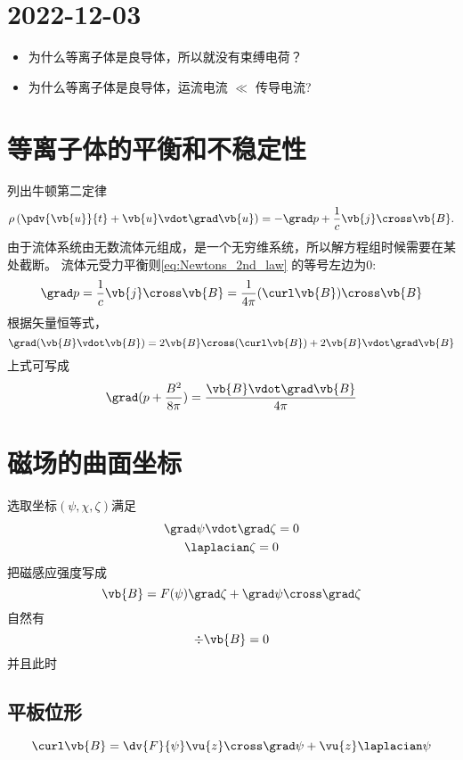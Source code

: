 \section{2022-12-03}
\begin{itemize}[\textcolor{red}{?}]
  \item 为什么等离子体是良导体，所以就没有束缚电荷？
  \item 为什么等离子体是良导体，运流电流 \( \ll \) 传导电流?
\end{itemize}

\section{等离子体的平衡和不稳定性}
列出牛顿第二定律
\begin{equation}
  \rho \left( \pdv{\vb{u}}{t} + \vb{u} \vdot \grad \vb{u} \right) = - \grad p + \frac{1}{c} \vb{j} \cross \vb{B}.
  \label{eq:Newtons_2nd_law}
\end{equation}
由于流体系统由无数流体元组成，是一个无穷维系统，所以解方程组时候需要在某处截断。
流体元受力平衡则\cref{eq:Newtons_2nd_law} 的等号左边为0:
\begin{equation}
  \grad p = \frac{1}{c} \vb{j} \cross \vb{B}
  = \frac{1}{4 \pi} ( \curl \vb{B} ) \cross \vb{B}
\end{equation}
根据矢量恒等式，
\begin{equation}
  \grad(\vb{B} \vdot \vb{B}) = 2\vb{B} \cross ( \curl \vb{B} ) + 2\vb{B} \vdot \grad \vb{B}
\end{equation}
上式可写成
\begin{equation}
  \grad(p + \frac{B^2}{8 \pi}) = \frac{\vb{B} \vdot \grad \vb{B}}{4 \pi} 
\end{equation}


\section{磁场的曲面坐标}
选取坐标\((\psi, \chi, \zeta)\)满足
\begin{gather}
  \grad \psi \vdot \grad \zeta = 0 \\
  \laplacian \zeta = 0
\end{gather}
把磁感应强度写成
\begin{equation}
  \vb{B} = F(\psi) \grad \zeta + \grad \psi \cross \grad \zeta
\end{equation}
自然有
\begin{equation}
  \div \vb{B} = 0
\end{equation}
并且此时
\subsection{平板位形}
\begin{equation}
  \curl \vb{B} = \dv{F}{\psi} \vu{z} \cross \grad \psi + \vu{z} \laplacian \psi
\end{equation}



